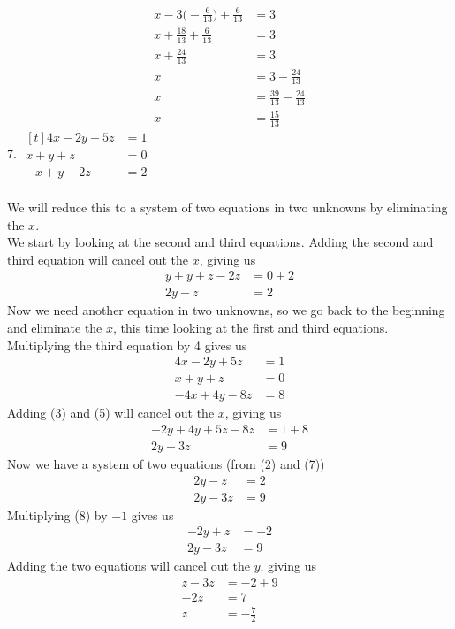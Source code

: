 \documentclass[12pt]{article}
\begin{document}
\begin{align*}
x-3\bigg(-\displaystyle \frac{6}{13}\bigg)+\displaystyle \frac{6}{13}&=3 \\
x+\displaystyle \frac{18}{13}+\displaystyle \frac{6}{13}&=3 \\
x+\displaystyle \frac{24}{13}&=3 \\
x&=3-\displaystyle \frac{24}{13} \\
x&=\displaystyle \frac{39}{13}-\displaystyle \frac{24}{13} \\
x&=\displaystyle \frac{15}{13}
\end{align*}
\setcounter{equation}{0}
7. $\begin{aligned}[t]
4x-2y+5z&=1 \\
x+y+z&=0 \\
-x+y-2z&=2
\end{aligned}$ \\
\\
We will reduce this to a system of two equations in two unknowns by eliminating the $x$. \\
We start by looking at the second and third equations. Adding the second and third equation will cancel out the $x$, giving us
\begin{align}
y+y+z-2z&=0+2 \\
2y-z&=2
\end{align}
Now we need another equation in two unknowns, so we go back to the beginning and eliminate the $x$, this time looking at the first and third equations. Multiplying the third equation by 4 gives us
\begin{align}
4x-2y+5z&=1 \\
x+y+z&=0 \\
-4x+4y-8z&=8
\end{align}
Adding (3) and (5) will cancel out the $x$, giving us
\begin{align}
-2y+4y+5z-8z&=1+8 \\
2y-3z&=9
\end{align}
Now we have a system of two equations (from (2) and (7))
\begin{align}
2y-z&=2 \\
2y-3z&=9
\end{align}
Multiplying (8) by $-1$ gives us
\begin{align*}
-2y+z&=-2 \\
2y-3z&=9
\end{align*}
Adding the two equations will cancel out the $y$, giving us
\begin{align*}
z-3z&=-2+9 \\
-2z&=7 \\
z&=-\displaystyle \frac{7}{2}
\end{align*}
\end{document}
